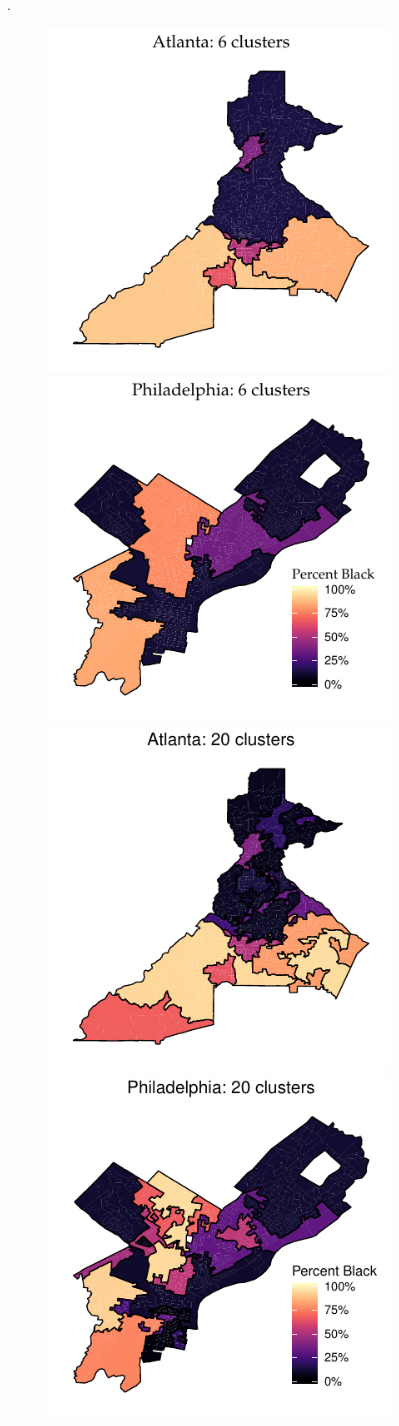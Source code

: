 \documentclass[english]{scrartcl}
\begin{document}
\begin{figure}
	. 

	\begin{figure}

		\includegraphics[width = .5\textwidth]{figs/Atlanta_clusters_binary_6.pdf} 
		\includegraphics[width = .5\textwidth]{figs/Philadelphia_clusters_binary_6.pdf} \\
		\includegraphics[width = .5\textwidth]{figs/Atlanta_clusters_binary_20.pdf}
		\includegraphics[width = .5\textwidth]{figs/Philadelphia_clusters_binary_20.pdf} \\
		

\end{figure}
\end{figure}
\end{document}
